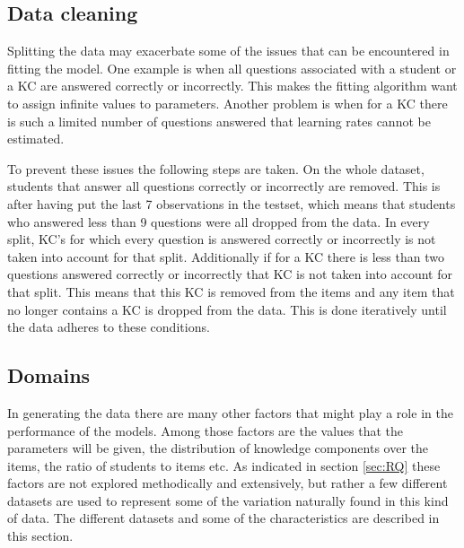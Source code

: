 \documentclass{scrartcl}
\begin{document}

\subsection{Data cleaning}
\label{sec:cleaning}
Splitting the data may exacerbate some of the issues that can be encountered in fitting the model. One example is when all questions associated with a student or a KC are answered correctly or incorrectly. This makes the fitting algorithm want to assign infinite values to parameters. Another problem is when for a KC there is such a limited number of questions answered that learning rates cannot be estimated.

To prevent these issues the following steps are taken. On the whole dataset, students that answer all questions correctly or incorrectly are removed. This is after having put the last 7 observations in the testset, which means that students who answered less than 9 questions were all dropped from the data. 
In every split, KC's for which every question is answered correctly or incorrectly is not taken into account for that split. Additionally if for a KC there is less than two questions answered correctly or incorrectly that KC is not taken into account for that split. This means that this KC is removed from the items and any item that no longer contains a KC is dropped from the data. This is done iteratively until the data adheres to these conditions.


\subsection{Domains}
\label{sec:domain}
In generating the data there are many other factors that might play a role in the performance of the models. Among those factors are the values that the parameters will be given, the distribution of knowledge components over the items, the ratio of students to items etc. As indicated in section \ref{sec:RQ} these factors are not explored methodically and extensively, but rather a few different datasets are used to represent some of the variation naturally found in this kind of data. The different datasets and some of the characteristics are described in this section.
\end{document}
